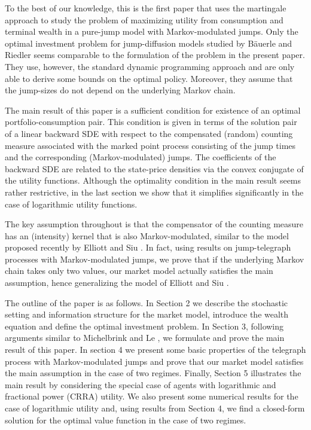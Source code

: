 \documentclass[11pt]{article}
\theoremstyle{plain}
\theoremstyle{definition}
\numberwithin{equation}{section}
\begin{document}
To the best of our knowledge, this is the first paper that uses the martingale approach to study the problem of maximizing utility from consumption and terminal wealth in a pure-jump model with Markov-modulated jumps. Only the optimal investment problem for jump-diffusion models studied  by B\"{a}uerle and Riedler \cite{bauerle2007} seems comparable to the formulation of the problem in the present paper. They use, however, the standard dynamic programming approach and are only able to derive some bounds on the optimal policy. Moreover, they assume that the jump-sizes do not depend on the underlying Markov chain.

The main result of this paper is a sufficient condition for existence of an optimal portfolio-consumption pair. This condition is given in terms of the solution pair of a linear backward SDE with respect to the compensated (random) counting measure associated with the marked point process consisting of the jump times and the corresponding (Markov-modulated) jumps. The coefficients of the backward SDE are related to the state-price densities via the convex conjugate of the utility functions. Although the optimality condition in the main result seems rather restrictive, in the last section we show that it simplifies significantly in the case of logarithmic utility functions.

The key assumption throughout is that the compensator of the counting measure has an (intensity) kernel that is also Markov-modulated, similar to the model proposed recently by Elliott and Siu \cite{elliottsiu}. In fact, using results on jump-telegraph processes with Markov-modulated jumps, we prove that if the underlying Markov chain takes only two values, our market model actually satisfies the main assumption, hence generalizing the model of Elliott and Siu \cite{elliottsiu}.

The outline of the paper is as follows. In Section 2 we describe the stochastic setting and information structure for the market model, introduce the wealth equation and define the optimal investment problem. In Section 3, following arguments similar to Michelbrink and Le \cite{michelbrink}, we formulate and prove the main result of this paper.  In section 4 we present some basic properties of the telegraph process with Markov-modulated jumps and prove that our market model satisfies the main assumption in the case of two regimes. Finally, Section 5 illustrates the main result by considering the special case of agents with logarithmic and fractional power (CRRA) utility. We also present some numerical results for the case of logarithmic utility and, using results from Section 4, we find a closed-form solution for the optimal value function in the case of two regimes.
\end{document}
